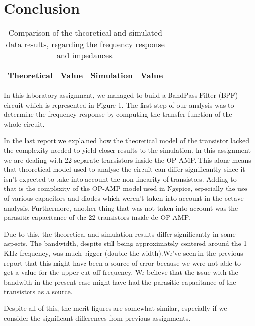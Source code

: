 \section{Conclusion}
\label{sec:conclusion}
\par
\begin{table}[!h]
  \centering
  \begin{tabular}{c c c c}
    \hline    
    {\bf Theoretical} & {\bf Value} & {\bf Simulation} & {\bf Value}\\ \hline
     
  \end{tabular}
  \caption{Comparison of the theoretical and simulated data results, regarding the frequency response and impedances.}
  \label{tab:comp}
\end{table}

In this laboratory assignment, we managed to build a BandPass Filter (BPF) circuit which is represented in Figure 1. The first step of our analysis was to determine the frequency response by computing the transfer function of the whole circuit.

In the last report we explained how the theoretical model of the transistor lacked the complexity needed to yield closer results to the simulation. In this assignment we are dealing with 22 separate transistors inside the OP-AMP. This alone means that theoretical model used to analyse the circuit can differ significantly since it isn't expected to take into account the non-linearity of transistors. Adding to that is the complexity of the OP-AMP model used in Ngspice, especially the use of various capacitors and diodes which weren't taken into account in the octave analysis. Furthermore, another thing that was not taken into account was the parasitic capacitance of the 22 transistors inside de OP-AMP. 

Due to this, the theoretical and simulation results differ significantly in some aspects. 
The bandwidth, despite still being approximately centered around the 1 KHz frequency, was much bigger (double the width).We've seen in the previous report that this might have been a source of error because we were not able to get a value for the upper cut off frequency. We believe that the issue with the bandwith in the present case might have had the parasitic capacitance of the transistors as a source.


Despite all of this, the merit figures are somewhat similar, especially if we consider the significant differences from previous assignments.
